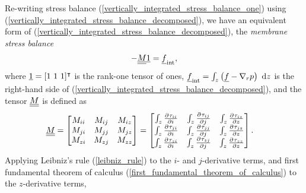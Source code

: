 Re-writing stress balance (\ref{vertically_integrated_stress_balance_one}) using (\ref{vertically_integrated_stress_balance_decomposed}), we have an equivalent form of (\ref{vertically_integrated_stress_balance_decomposed}), the \emph{membrane stress balance}
\begin{align}
  \label{membrane_stress_balance}
  - \underline{\underline{M}} \underline{1} = \underline{f}_{\text{int}}, 
\end{align}
where $\underline{1} = [1\ 1\ 1]^\intercal$ is the rank-one tensor of ones, $\underline{f}_{\text{int}} = \int_z \left( \underline{f} - \nabla_r p \right) \ \mathrm{d}z$ is the right-hand side of (\ref{vertically_integrated_stress_balance_decomposed}), and the tensor $\underline{\underline{M}}$ is defined as
\begin{align}
  \label{membrane_stress_balance_tensor}
  \underline{\underline{M}} &= \begin{bmatrix}
                   M_{ii} & M_{ij} & M_{iz} \\
                   M_{ji} & M_{jj} & M_{jz} \\
                   M_{zi} & M_{zj} & M_{zz}
                 \end{bmatrix}
               = \begin{bmatrix}
                   \int_z \frac{\partial^{} \tau_{ii}}{\partial i^{} } & \int_z \frac{\partial^{} \tau_{ij}}{\partial j^{} } & \int_z \frac{\partial^{} \tau_{iz}}{\partial z^{} }  \\ 
                   \int_z \frac{\partial^{} \tau_{ji}}{\partial i^{} } & \int_z \frac{\partial^{} \tau_{jj}}{\partial j^{} } & \int_z \frac{\partial^{} \tau_{jz}}{\partial z^{} }  \\ 
                   \int_z \frac{\partial^{} \tau_{zi}}{\partial i^{} } & \int_z \frac{\partial^{} \tau_{zj}}{\partial j^{} } & \int_z \frac{\partial^{} \tau_{zz}}{\partial z^{} }
                 \end{bmatrix}.
\end{align}
Applying Leibniz's rule (\ref{leibniz_rule})  to the $i$- and $j$-derivative terms, and first fundamental theorem of calculus (\ref{first_fundamental_theorem_of_calculus})  to the $z$-derivative terms,
